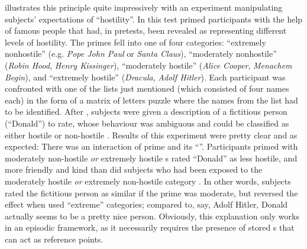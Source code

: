 \citeauthor{herr1986} illustrates this principle quite impressively with an experiment manipulating subjects' expectations of ``hostility''.
In this test \citeauthor{herr1986} primed participants with the help of famous people that had, in pretests, been revealed as representing different levels of hostility.
The primes fell into one of four categories: ``extremely nonhostile'' (e.g. \emph{Pope John Paul} or \emph{Santa Claus}), ``moderately nonhostile'' (\emph{Robin Hood}, \emph{Henry Kissinger}), ``moderately hostile'' (\emph{Alice Cooper}, \emph{Menachem Begin}), and ``extremely hostile'' (\emph{Dracula}, \emph{Adolf Hitler}).
Each participant was confronted with one of the lists just mentioned (which consisted of four names each) in the form of a matrix of letters puzzle where the names from the list had to be identified.
After , subjects were given a description of a fictitious person (``Donald'') to rate, whose behaviour was ambiguous and could be classified as either hostile or non-hostile \parencite[cf.][1108]{herr1986}.
Results of this experiment were pretty clear and as expected: There was an interaction of prime and its ``''.
Participants primed with moderately non-hostile \emph{or} extremely hostile s rated ``Donald'' as less hostile, and more friendly and kind than did subjects who had been exposed to the moderately hostile \emph{or} extremely non-hostile category \parencite[cf.][1109]{herr1986}.
In other words, subjects rated the fictitious person as similar if the prime was moderate, but reversed the effect when  used ``extreme'' categories; compared to, say, Adolf Hitler, Donald actually seems to be a pretty nice person.
Obviously, this explanation only works in an episodic framework, as it necessarily requires the presence of stored s that can act as reference points.

